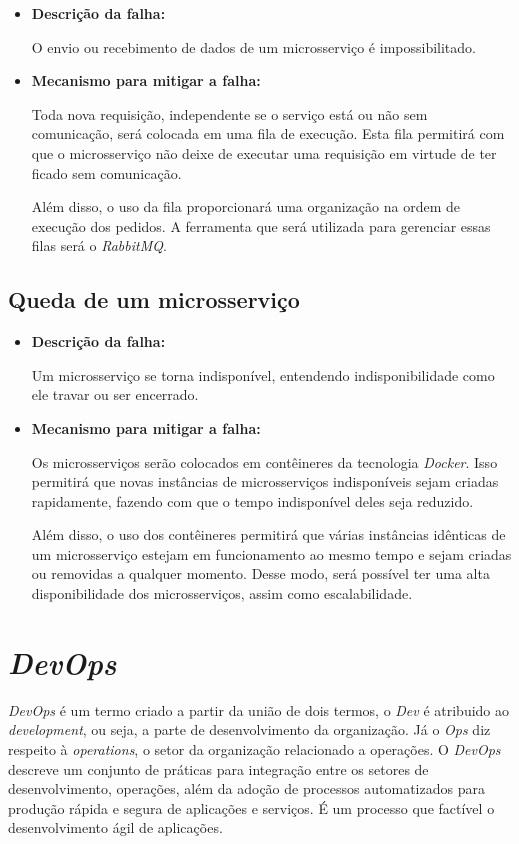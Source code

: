 \begin{itemize}
    \item \textbf{Descrição da falha:}

     O envio ou recebimento de dados de um microsserviço é impossibilitado.

    \item \textbf{Mecanismo para mitigar a falha:}

    Toda nova requisição, independente se o serviço está ou não sem comunicação, será colocada em uma fila de execução. Esta fila permitirá com que o microsserviço não deixe de executar uma requisição em virtude de ter ficado sem comunicação.

    Além disso, o uso da fila proporcionará uma organização na ordem de execução dos pedidos. A ferramenta que será utilizada para gerenciar essas filas será o \textit{RabbitMQ}.
\end{itemize}

\subsection{Queda de um microsserviço}

\begin{itemize}
    \item \textbf{Descrição da falha:}

    Um microsserviço se torna indisponível, entendendo indisponibilidade como ele travar ou ser encerrado.

    \item \textbf{Mecanismo para mitigar a falha:}

    Os microsserviços serão colocados em contêineres da tecnologia \textit{Docker}. Isso permitirá que novas instâncias de microsserviços indisponíveis sejam criadas rapidamente, fazendo com que o tempo indisponível deles seja reduzido.

    Além disso, o uso dos contêineres permitirá que várias instâncias idênticas de um microsserviço estejam em funcionamento ao mesmo tempo e sejam criadas ou removidas a qualquer momento. Desse modo, será possível ter uma alta disponibilidade dos microsserviços, assim como escalabilidade.
\end{itemize}

\section{\textit{DevOps}}

\textit{DevOps} é um termo criado a partir da união de dois termos, o \textit{Dev} é atribuido ao \textit{development}, ou seja, a parte de desenvolvimento da organização. Já o \textit{Ops} diz respeito à \textit{operations}, o setor da organização relacionado a operações. O \textit{DevOps} descreve um conjunto de práticas para integração entre os setores de desenvolvimento, operações, além da adoção de processos automatizados para produção rápida e segura de aplicações e serviços. É um processo que factível o desenvolvimento ágil de aplicações.

